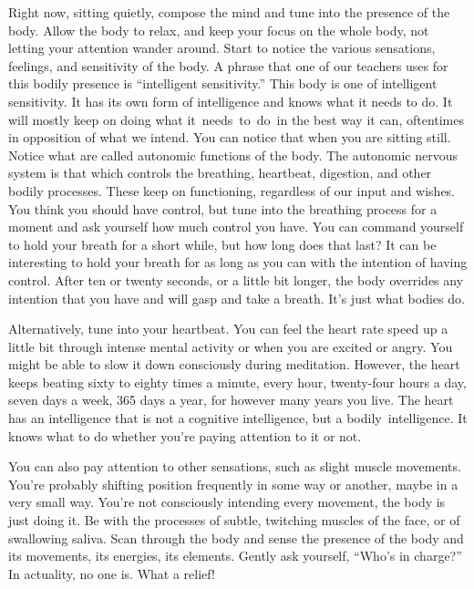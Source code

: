 Right now, sitting quietly, compose the mind and tune into the presence of the body. Allow the body to relax, and keep your focus on the whole body, not letting your attention wander around. Start to notice the various sensations, feelings, and sensitivity of the body. A phrase that one of our teachers uses for this bodily presence is ``intelligent sensitivity.'' This body is one of intelligent sensitivity. It has its own form of intelligence and knows what it needs to do. It will mostly keep on doing what \mbox{it needs to do in} the best way it can, oftentimes in opposition of what we intend. You can notice that when you are sitting still. Notice what are called autonomic functions of the body. The autonomic nervous system is that which controls the breathing, heartbeat, digestion, and other bodily processes. These keep on functioning, regardless of our input and wishes. You think you should have control, but tune into the breathing process for a moment and ask yourself how much control you have. You can command yourself to hold your breath for a short while, but how long does that last? It can be interesting to hold your breath for as long as you can with the intention of having control. After ten or twenty seconds, or a little bit longer, the body overrides any intention that you have and will gasp and take a breath. It's just what bodies do.

Alternatively, tune into your heartbeat. You can feel the heart rate speed up a little bit through intense mental activity or when you are excited or angry. You might be able to slow it down consciously during meditation. However, the heart keeps beating sixty to eighty times a minute, every hour, twenty-four hours a day, seven days a week, 365 days a year, for however many years you live. The heart has an intelligence that is not a cognitive intelligence, but a \mbox{bodily intelligence.} It knows what to do whether you're paying attention to it or not.

You can also pay attention to other sensations, such as slight muscle movements. You're probably shifting position frequently in some way or another, maybe in a very small way. You're not consciously intending every movement, the body is just doing it. Be with the processes of subtle, twitching muscles of the face, or of swallowing saliva. Scan through the body and sense the presence of the body and its movements, its energies, its elements. Gently ask yourself, ``Who's in charge?'' In actuality, no one is. What a relief!

